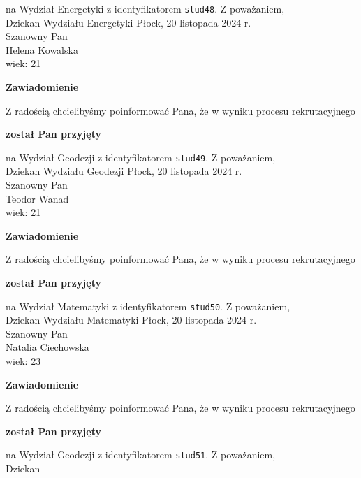 \documentclass[12pt,a4paper]{article}
\begin{document}
na Wydział Energetyki z identyfikatorem \verb|stud48|. 
\vspace{2cm}
\noindent
Z poważaniem,\\
Dziekan
Wydziału Energetyki
\newpage
\hfill Płock, 20 listopada 2024 r.\\
\noindent 
Szanowny Pan \\
Helena Kowalska \\
wiek: 21
\bigskip
\begin{center}
 	{\Large\textbf{Zawiadomienie}}
\end{center}
\bigskip
Z radością chcielibyśmy poinformować Pana, że w wyniku procesu rekrutacyjnego 
\begin{center}
\textsf{\textbf{został Pan przyjęty}} 
\end{center}
na Wydział Geodezji z identyfikatorem \verb|stud49|. 
\vspace{2cm}
\noindent
Z poważaniem,\\
Dziekan
Wydziału Geodezji
\newpage
\hfill Płock, 20 listopada 2024 r.\\
\noindent 
Szanowny Pan \\
Teodor Wanad \\
wiek: 21
\bigskip
\begin{center}
 	{\Large\textbf{Zawiadomienie}}
\end{center}
\bigskip
Z radością chcielibyśmy poinformować Pana, że w wyniku procesu rekrutacyjnego 
\begin{center}
\textsf{\textbf{został Pan przyjęty}} 
\end{center}
na Wydział Matematyki z identyfikatorem \verb|stud50|. 
\vspace{2cm}
\noindent
Z poważaniem,\\
Dziekan
Wydziału Matematyki
\newpage
\hfill Płock, 20 listopada 2024 r.\\
\noindent 
Szanowny Pan \\
Natalia Ciechowska \\
wiek: 23
\bigskip
\begin{center}
 	{\Large\textbf{Zawiadomienie}}
\end{center}
\bigskip
Z radością chcielibyśmy poinformować Pana, że w wyniku procesu rekrutacyjnego 
\begin{center}
\textsf{\textbf{został Pan przyjęty}} 
\end{center}
na Wydział Geodezji z identyfikatorem \verb|stud51|. 
\vspace{2cm}
\noindent
Z poważaniem,\\
Dziekan
\end{document}

